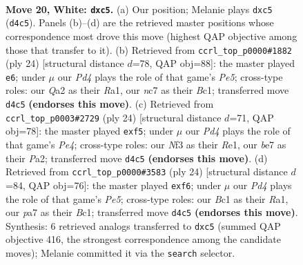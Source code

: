 \documentclass[11pt]{article}
\begin{document}
\begin{figure}[p]
\label{fig:thought-m36}
\end{figure}

\clearpage

\begin{figure}[p]\centering
\begin{subfigure}{0.46\textwidth}\centering
\resizebox{\linewidth}{!}{%
\newchessgame
\chessboard[
  setfen={1rbq1r1k/p1n1b2p/1p4p1/2pp1p1n/P2P1P2/1P3NP1/Q2NP1BP/R1B1R1K1 w - - 0 20},
  showmover=false,
  pgfstyle=straightmove, color=movearrow, markmove={d4-c5}
]}
\caption{}
\end{subfigure}\hfill
\begin{subfigure}{0.46\textwidth}\centering
\resizebox{\linewidth}{!}{%
\newchessgame
\chessboard[
  setfen={r1bqr1k1/1p1nbp1p/p1n3p1/2ppP3/3P4/P2B1N1P/1P1N1PP1/R1BQR1K1 w - - 0 13},
  showmover=false,
  pgfstyle=straightmove, color=movearrow, markmove={e5-e6}
]}
\caption{}
\end{subfigure}
\\[4pt]
\begin{subfigure}{0.46\textwidth}\centering
\resizebox{\linewidth}{!}{%
\newchessgame
\chessboard[
  setfen={1rbq1r1k/p1p4p/2nppbp1/1p3p2/3PP2P/2PB1N2/PPQN1PP1/2K1R2R w - - 0 13},
  showmover=false,
  pgfstyle=straightmove, color=movearrow, markmove={e4-f5}
]}
\caption{}
\end{subfigure}\hfill
\begin{subfigure}{0.46\textwidth}\centering
\resizebox{\linewidth}{!}{%
\newchessgame
\chessboard[
  setfen={r1b2rk1/1pq1p1bp/p1n2ppn/3pP3/3P4/P2B1N1P/1P1N1PP1/R1BQR1K1 w - - 0 13},
  showmover=false,
  pgfstyle=straightmove, color=movearrow, markmove={e5-f6}
]}
\caption{}
\end{subfigure}
\caption{\textbf{Move 20, White: \texttt{dxc5}.} (a) Our position; Melanie plays \texttt{dxc5} (\texttt{d4c5}). Panels (b)--(d) are the retrieved master positions whose correspondence most drove this move (highest QAP objective among those that transfer to it). (b) Retrieved from \texttt{ccrl\_top\_p0000\#1882} (ply 24) [structural distance $d$=78, QAP obj=88]: the master played \texttt{e6}; under $\mu$ our \emph{Pd4} plays the role of that game's \emph{Pe5}; cross-type roles: our \emph{Q}a2 as their \emph{R}a1, our \emph{n}c7 as their \emph{B}c1; transferred move \texttt{d4c5} \textbf{(endorses this move)}. (c) Retrieved from \texttt{ccrl\_top\_p0003\#2729} (ply 24) [structural distance $d$=71, QAP obj=78]: the master played \texttt{exf5}; under $\mu$ our \emph{Pd4} plays the role of that game's \emph{Pe4}; cross-type roles: our \emph{N}f3 as their \emph{R}e1, our \emph{b}e7 as their \emph{P}a2; transferred move \texttt{d4c5} \textbf{(endorses this move)}. (d) Retrieved from \texttt{ccrl\_top\_p0000\#3583} (ply 24) [structural distance $d$=84, QAP obj=76]: the master played \texttt{exf6}; under $\mu$ our \emph{Pd4} plays the role of that game's \emph{Pe5}; cross-type roles: our \emph{B}c1 as their \emph{R}a1, our \emph{p}a7 as their \emph{B}c1; transferred move \texttt{d4c5} \textbf{(endorses this move)}. Synthesis: 6 retrieved analogs transferred to \texttt{dxc5} (summed QAP objective 416, the strongest correspondence among the candidate moves); Melanie committed it via the \texttt{search} selector.}

\end{figure}
\end{document}
